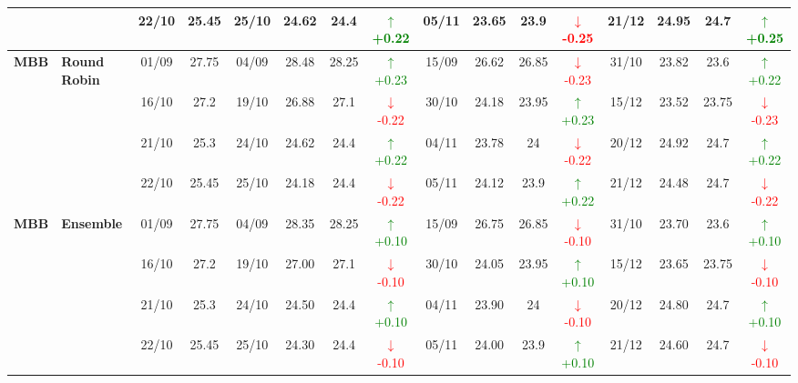 \documentclass{ieeeaccess}
\begin{document}
{\begin{longtable}{llcc|cccc|cccc|cccc}
&
& 22/10 & 25.45 & 25/10 & 24.62 & 24.4 & \textcolor{green}{\(\uparrow\)+0.22} & 05/11 & 23.65 & 23.9 & \textcolor{red}{\(\downarrow\)-0.25} & 21/12 & 24.95 & 24.7 & \textcolor{green}{\(\uparrow\)+0.25} \\
\midrule


\multirow{4}{*}{\textbf{MBB}} 
& \textbf{Round Robin}
& 01/09 & 27.75 & 04/09 & 28.48 & 28.25 & \textcolor{green}{\(\uparrow\)+0.23} & 15/09 & 26.62 & 26.85 & \textcolor{red}{\(\downarrow\)-0.23} & 31/10 & 23.82 & 23.6 & \textcolor{green}{\(\uparrow\)+0.22} \\

&
& 16/10 & 27.2 & 19/10 & 26.88 & 27.1 & \textcolor{red}{\(\downarrow\)-0.22} & 30/10 & 24.18 & 23.95 & \textcolor{green}{\(\uparrow\)+0.23} & 15/12 & 23.52 & 23.75 & \textcolor{red}{\(\downarrow\)-0.23} \\

&
& 21/10 & 25.3 & 24/10 & 24.62 & 24.4 & \textcolor{green}{\(\uparrow\)+0.22} & 04/11 & 23.78 & 24 & \textcolor{red}{\(\downarrow\)-0.22} & 20/12 & 24.92 & 24.7 & \textcolor{green}{\(\uparrow\)+0.22} \\

&
& 22/10 & 25.45 & 25/10 & 24.18 & 24.4 & \textcolor{red}{\(\downarrow\)-0.22} & 05/11 & 24.12 & 23.9 & \textcolor{green}{\(\uparrow\)+0.22} & 21/12 & 24.48 & 24.7 & \textcolor{red}{\(\downarrow\)-0.22} \\
\midrule



\multirow{4}{*}{\textbf{MBB}} 
& \textbf{Ensemble}
& 01/09 & 27.75 & 04/09 & 28.35 & 28.25 & \textcolor{green}{\(\uparrow\)+0.10} & 15/09 & 26.75 & 26.85 & \textcolor{red}{\(\downarrow\)-0.10} & 31/10 & 23.70 & 23.6 & \textcolor{green}{\(\uparrow\)+0.10} \\

&
& 16/10 & 27.2 & 19/10 & 27.00 & 27.1 & \textcolor{red}{\(\downarrow\)-0.10} & 30/10 & 24.05 & 23.95 & \textcolor{green}{\(\uparrow\)+0.10} & 15/12 & 23.65 & 23.75 & \textcolor{red}{\(\downarrow\)-0.10} \\

&
& 21/10 & 25.3 & 24/10 & 24.50 & 24.4 & \textcolor{green}{\(\uparrow\)+0.10} & 04/11 & 23.90 & 24 & \textcolor{red}{\(\downarrow\)-0.10} & 20/12 & 24.80 & 24.7 & \textcolor{green}{\(\uparrow\)+0.10} \\

&
& 22/10 & 25.45 & 25/10 & 24.30 & 24.4 & \textcolor{red}{\(\downarrow\)-0.10} & 05/11 & 24.00 & 23.9 & \textcolor{green}{\(\uparrow\)+0.10} & 21/12 & 24.60 & 24.7 & \textcolor{red}{\(\downarrow\)-0.10} \\


\bottomrule
\end{longtable}
}
\end{document}
